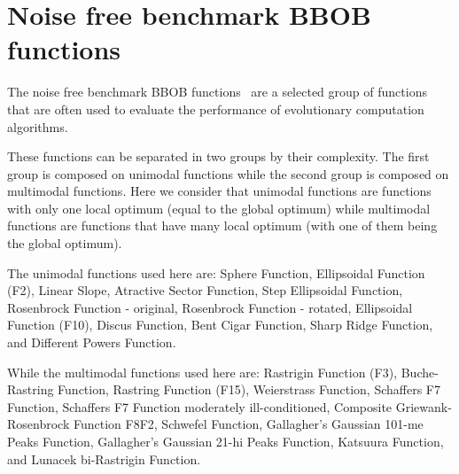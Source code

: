 \section{Noise free benchmark BBOB functions}

The noise free benchmark BBOB functions~\cite{hansen2010real} are a selected group of functions that are often used to evaluate the performance of evolutionary computation algorithms.


These functions can be separated in two groups by their complexity. The first group is composed on unimodal functions while the second group is composed on multimodal functions. Here we consider that unimodal functions are functions with only one local optimum (equal to the global optimum) while multimodal functions are functions that have many local optimum (with one of them being the global optimum). 

The unimodal functions used here are: Sphere Function, Ellipsoidal Function (F2), Linear Slope, Atractive Sector Function, Step Ellipsoidal Function, Rosenbrock Function - original, Rosenbrock Function - rotated, Ellipsoidal Function (F10), Discus Function, Bent Cigar Function, Sharp Ridge Function, and Different Powers Function.

While the multimodal functions used here are: Rastrigin Function (F3), Buche-Rastring Function, Rastring Function (F15), Weierstrass Function, Schaffers F7 Function, Schaffers F7 Function moderately ill-conditioned, Composite Griewank-Rosenbrock Function F8F2, Schwefel Function, Gallagher's Gaussian 101-me Peaks Function, Gallagher's Gaussian 21-hi Peaks Function, Katsuura Function, and Lunacek bi-Rastrigin Function.
